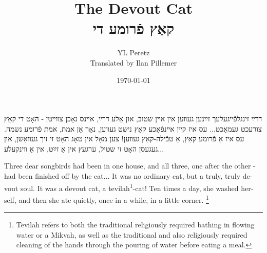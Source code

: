 \documentclass{article}
\begin{document}
\title{The Devout Cat \\ קאַץ פֿרומע די}
\author{YL Peretz\\Translated by Ilan Pillemer}
\date{\today}

\maketitle
\pstartnumfalse
\begin{pairs}

\begin{Rightside}
\begin{RTL}
\begin{hebrew}
\beginnumbering


\pstart
דרײַ זינגלפֿײגעלעך זײַנען געװען אין אײן שטוב, און אַלע דרײַ, אײנס נאָכן צװײטן - האָט די קאַץ צורעכט געמאַכט...
\pend
\pstart
עס איז קײן אײנפֿאַכע קאַץ נישט געװען, נאָר אַן אמת, אמת פֿרומע נשמה.
\pend
\pstart
עס איז אַ פֿרומע קאַץ, אַ טבֿילה-קאַץ געװען! צען מאָל אין טאָג האָט זי זיך געװאַשן, און געגעסן האָט זי שטיל, ערגעץ אין אַ זײַט, אין אַ װינקעלע...
\pend
\endnumbering
\end{hebrew}
\end{RTL}
\end{Rightside}




\begin{Leftside}
\begin{english}
\beginnumbering
\pstart
Three dear songbirds had been in one house, and all three, one after the other - had been finished off by the cat...
\pend
\pstart
It was no ordinary cat, but a truly, truly devout soul. 
\pend
\pstart
It was a devout cat, a tevilah\textsuperscript{1}-cat!
Ten times a day, she washed herself, and then she ate quietly, once in a while, in a little corner.
\pend
 \footnote{Tevilah refers to both the traditional religiously required bathing in flowing water or a Mikvah, as well as the traditional and also religiously required cleaning of the hands through the pouring of water before eating a meal.} 
\endnumbering
\end{english}
\end{Leftside}

\end{pairs}
\Columns
\end{document}
